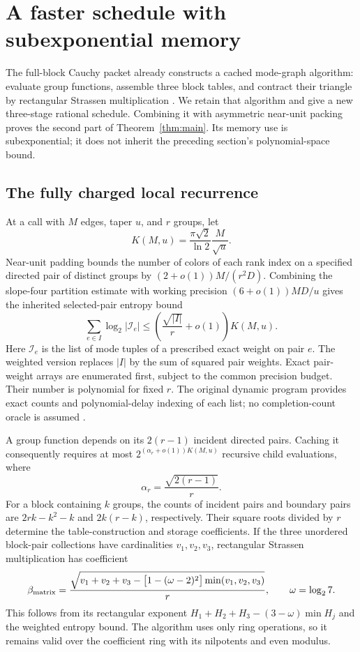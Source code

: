 \section{A faster schedule with subexponential memory}\label{sec:cached}

The full-block Cauchy packet already constructs a cached mode-graph
algorithm: evaluate group functions, assemble three block tables, and
contract their triangle by rectangular Strassen multiplication
\cite{joint}. We retain that algorithm and give a new three-stage rational
schedule. Combining it with asymmetric near-unit packing \cite{asymmetric}
proves the second part of Theorem~\ref{thm:main}. Its memory use is
subexponential; it does not inherit the preceding section's polynomial-space
bound.

\subsection{The fully charged local recurrence}

At a call with $M$ edges, taper $u$, and $r$ groups, let
\[
 K(M,u)=\frac{\pi\sqrt2}{\ln2}\frac{M}{\sqrt u}.
\]
Near-unit padding bounds the number of colors of each rank index on a
specified directed pair of distinct groups by
$(2+o(1))M/(r^2D)$. Combining the slope-four partition estimate with working
precision $(6+o(1))MD/u$ gives the inherited selected-pair entropy bound
\[
 \sum_{e\in I}\log_2 |\mathcal I_e|
 \le\left(\frac{\sqrt{|I|}}r+o(1)\right)K(M,u).
\]
Here $\mathcal I_e$ is the list of mode tuples of a prescribed exact weight
on pair $e$. The weighted version replaces $|I|$ by the sum of squared
pair weights. Exact pair-weight arrays are enumerated first, subject to
the common precision budget. Their number is polynomial for fixed $r$.
The original dynamic program provides exact counts and polynomial-delay
indexing of each list; no completion-count oracle is assumed \cite{joint}.

A group function depends on its $2(r-1)$ incident directed pairs. Caching
it consequently requires at most
$2^{(\alpha_r+o(1))K(M,u)}$ recursive child evaluations, where
\[
 \alpha_r=\frac{\sqrt{2(r-1)}}r.
\]
For a block containing $k$ groups, the counts of incident pairs and boundary
pairs are $2rk-k^2-k$ and $2k(r-k)$, respectively. Their square roots divided
by $r$ determine the table-construction and storage coefficients. If the
three unordered block-pair collections have cardinalities $v_1,v_2,v_3$,
rectangular Strassen multiplication has coefficient
\[
 \beta_{\rm matrix}=
 \frac{\sqrt{v_1+v_2+v_3-\bigl[1-(\omega-2)^2\bigr]
                   \min(v_1,v_2,v_3)}}r,
 \qquad \omega=\log_2 7.
\]
This follows from its rectangular exponent
$H_1+H_2+H_3-(3-\omega)\min H_j$ and the weighted entropy bound.
The algorithm uses only ring operations, so it remains valid over the
coefficient ring with its nilpotents and even modulus.

